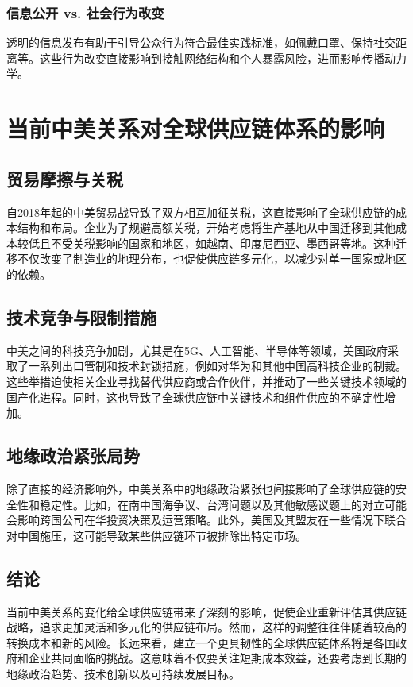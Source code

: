\documentclass[UTF8,a4paper]{ctexart}
\begin{document}
	\subsubsection{信息公开 vs. 社会行为改变}
	透明的信息发布有助于引导公众行为符合最佳实践标准，如佩戴口罩、保持社交距离等。这些行为改变直接影响到接触网络结构和个人暴露风险，进而影响传播动力学。
	
	\newpage
    
	\section{当前中美关系对全球供应链体系的影响}
	
	\subsection{贸易摩擦与关税}
	自2018年起的中美贸易战导致了双方相互加征关税，这直接影响了全球供应链的成本结构和布局。企业为了规避高额关税，开始考虑将生产基地从中国迁移到其他成本较低且不受关税影响的国家和地区，如越南、印度尼西亚、墨西哥等地。这种迁移不仅改变了制造业的地理分布，也促使供应链多元化，以减少对单一国家或地区的依赖。
	
	\subsection{技术竞争与限制措施}
	中美之间的科技竞争加剧，尤其是在5G、人工智能、半导体等领域，美国政府采取了一系列出口管制和技术封锁措施，例如对华为和其他中国高科技企业的制裁。这些举措迫使相关企业寻找替代供应商或合作伙伴，并推动了一些关键技术领域的国产化进程。同时，这也导致了全球供应链中关键技术和组件供应的不确定性增加。
	
	\subsection{地缘政治紧张局势}
	除了直接的经济影响外，中美关系中的地缘政治紧张也间接影响了全球供应链的安全性和稳定性。比如，在南中国海争议、台湾问题以及其他敏感议题上的对立可能会影响跨国公司在华投资决策及运营策略。此外，美国及其盟友在一些情况下联合对中国施压，这可能导致某些供应链环节被排除出特定市场。
	
	\subsection{结论}
	当前中美关系的变化给全球供应链带来了深刻的影响，促使企业重新评估其供应链战略，追求更加灵活和多元化的供应链布局。然而，这样的调整往往伴随着较高的转换成本和新的风险。长远来看，建立一个更具韧性的全球供应链体系将是各国政府和企业共同面临的挑战。这意味着不仅要关注短期成本效益，还要考虑到长期的地缘政治趋势、技术创新以及可持续发展目标。
	
\end{document}
